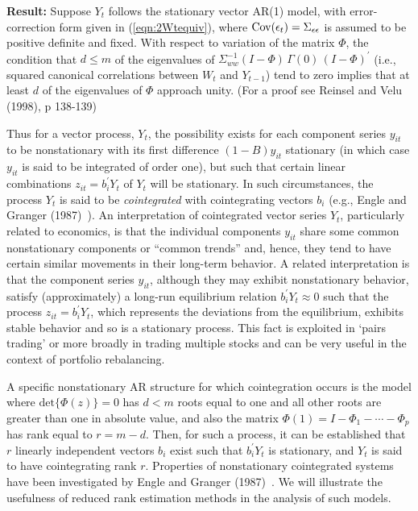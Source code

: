 \noindent\textbf{Result:}  Suppose $Y_t$ follows the stationary vector AR(1) model, with error-correction form given in (\ref{eqn:2Wtequiv}), where $\operatorname{Cov}(\epsilon_t) = \Sigma_{\epsilon \epsilon}$ is assumed to be positive definite and fixed. With respect to variation of the matrix $\Phi$, the condition that $d \leq m$ of the eigenvalues of $\Sigma_{ww}^{-1} (I- \Phi )\, \Gamma (0) \,(I- \Phi )^{\prime} $ (i.e., squared canonical correlations between $W_t$ and $Y_{t-1}$) tend to zero implies that at least $d$ of the eigenvalues of $\Phi$ approach unity. (For a proof see Reinsel and Velu (1998), p 138-139)~\cite{velurein}


Thus for a vector process, $Y_t$, the possibility exists for each component series $y_{it}$ to be nonstationary with its first difference $(1 - B) y_{it}$ stationary (in which case $y_{it}$ is said to be integrated of order one), but such that certain linear combinations $z_{it} = b_i^{\prime} Y_t $ of $Y_t$
will be stationary.  In such circumstances, the process $Y_t$ is said to be \textit{cointegrated} with cointegrating vectors $b_i$ (e.g., Engle and Granger (1987)~\cite{engle1987co}).  An interpretation of cointegrated vector series $Y_t$, particularly related to economics, is that the individual components $y_{it}$ share some common nonstationary components or ``common trends'' and, hence, they tend to have certain similar movements in their long-term behavior.  A related interpretation is that the component series $y_{it}$, although they may exhibit nonstationary behavior, satisfy (approximately) a long-run equilibrium relation $b_i^{\prime} Y_t \approx 0$ such that the process $z_{it} = b_i^{\prime} Y_t$, which represents the deviations from the equilibrium, exhibits stable behavior and so is a stationary process. This fact is exploited in `pairs trading' or more broadly in trading multiple stocks and can be very useful in the context of portfolio rebalancing. 


A specific nonstationary AR structure for which cointegration occurs is the model where $\mbox{det} \{ \Phi (z) \} = 0$ has $d < m$ roots equal to one and all other roots are greater than one in absolute value, and also the matrix $\Phi (1) = I - \Phi_1 - \cdots - \Phi_p$ has rank equal to $r = m - d$.  Then, for such a process, it can be established that $r$ linearly independent vectors $b_i$ exist such that $b_i^{\prime} Y_t$ is stationary, and $Y_t$ is said to have cointegrating rank $r$.  Properties of nonstationary cointegrated systems have been investigated by Engle and Granger (1987)~\cite{engle1987co}. We will illustrate the usefulness of reduced rank estimation methods in the analysis of such models.



